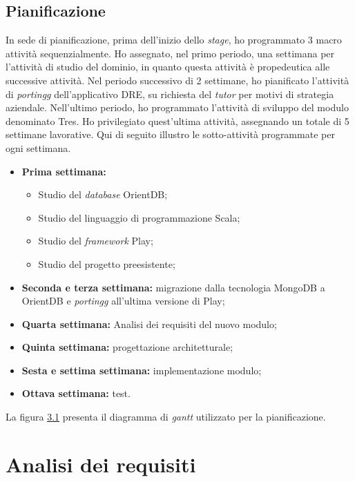 \subsection{Pianificazione}
In sede di pianificazione, prima dell'inizio dello \emph{stage}, ho programmato 3 macro attività sequenzialmente. Ho assegnato, nel primo periodo, una settimana per l'attività di studio del dominio, in quanto questa attività è propedeutica alle successive attività. Nel periodo successivo di 2 settimane, ho pianificato l'attività di \emph{\gls{portingg}} dell'applicativo DRE, su richiesta del \emph{tutor} per motivi di strategia aziendale. Nell'ultimo periodo, ho programmato l'attività di sviluppo del modulo denominato Tres. Ho privilegiato quest'ultima attività, assegnando un totale di 5 settimane lavorative. Qui di seguito illustro le sotto-attività programmate per ogni settimana. 
\begin{itemize}
\item \textbf{Prima settimana:}
\begin{itemize}
\item Studio del \emph{database} OrientDB;
\item Studio del linguaggio di programmazione Scala;
\item Studio del \emph{framework} Play;
\item Studio del progetto preesistente;
\end{itemize}
\item \textbf{Seconda e terza settimana:} migrazione dalla tecnologia MongoDB a OrientDB e \emph{\gls{portingg}} all’ultima versione di Play;
\item \textbf{Quarta settimana:} Analisi dei requisiti del nuovo modulo;
\item \textbf{Quinta settimana:} progettazione architetturale;
\item \textbf{Sesta e settima settimana:} implementazione modulo;
\item \textbf{Ottava settimana:} test.
\end{itemize}
La figura \hyperref[fig:gantt]{3.1} presenta il diagramma di \emph{gantt} utilizzato per la pianificazione.




\section{Analisi dei requisiti} 
